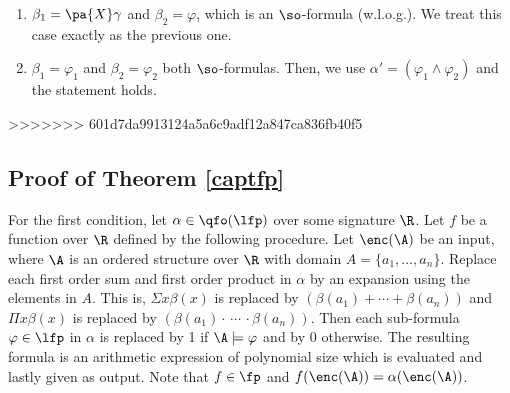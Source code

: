 \begin{enumerate}
\begin{enumerate}
		\item $\beta_1 = \pa{X} \gamma$ and $\beta_2 = \varphi$, which is an $\so$-formula (w.l.o.g.). We treat this case exactly as the previous one.

		\item $\beta_1 = \varphi_1$ and $\beta_2 = \varphi_2$ both $\so$-formulas. Then, we use $\alpha' = (\varphi_1 \wedge \varphi_2)$ and the statement holds.

	\end{enumerate}

\end{enumerate}

>>>>>>> 601d7da9913124a5a6c9adf12a847ca836fb40f5



\subsection*{Proof of Theorem \ref{captfp}}

For the first condition, let $\alpha\in\qfo(\lfp)$ over some signature $\R$. Let $f$ be a function over $\R$ defined by the following procedure. Let $\enc(\A)$ be an input, where $\A$ is an ordered structure over $\R$ with domain $A = \{a_1,\ldots,a_n\}$. Replace each first order sum and first order product in $\alpha$ by an expansion using the elements in $A$. This is, $\Sigma x \beta(x)$ is replaced by $(\beta(a_1)+\cdots+\beta(a_n))$ and $\Pi x \beta(x)$ is replaced by $(\beta(a_1)\cdot\,\cdots\,\cdot\beta(a_n))$. Then each sub-formula $\varphi\in\lfp$ in $\alpha$ is replaced by 1 if $\A\models\varphi$ and by 0 otherwise. The resulting formula is an arithmetic expression of polynomial size which is evaluated and lastly given as output. Note that $f\in\fp$ and $f(\enc(\A)) = \alpha(\enc(\A))$.
	
